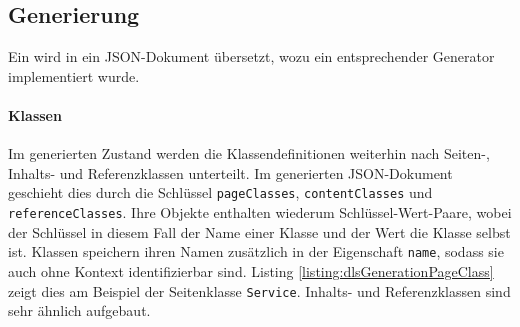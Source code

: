 \subsection{Generierung}
    \label{section:solutionDetailsDslGeneration}
    Ein {\classificationModel} wird in ein JSON-Dokument übersetzt,
    wozu ein entsprechender Generator implementiert wurde.

    \paragraph{Klassen}
    Im generierten Zustand werden die Klassendefinitionen weiterhin nach
    Seiten-, Inhalts- und Referenzklassen unterteilt.
    Im generierten JSON-Dokument geschieht dies durch die Schlüssel \texttt{pageClasses},
    \texttt{contentClasses} und \texttt{referenceClasses}.
    Ihre Objekte enthalten wiederum Schlüssel-Wert-Paare,
    wobei der Schlüssel in diesem Fall der Name einer Klasse und der
    Wert die Klasse selbst ist.
    Klassen speichern ihren Namen zusätzlich in der Eigenschaft \texttt{name},
    sodass sie auch ohne Kontext identifizierbar sind.
    Listing \ref{listing:dlsGenerationPageClass} zeigt dies am Beispiel
    der Seitenklasse \texttt{Service}.
    Inhalts- und Referenzklassen sind sehr ähnlich aufgebaut.

    

